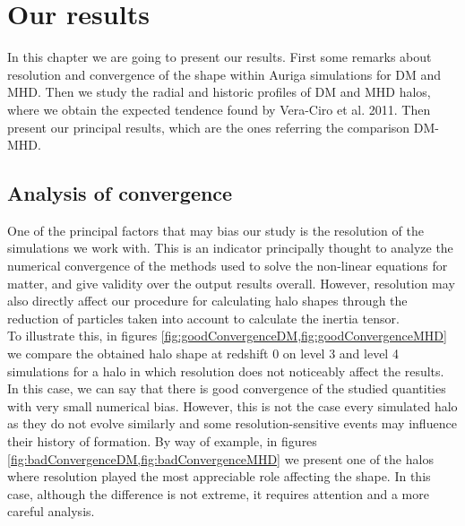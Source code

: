 \chapter{Our results}

In this chapter we are going to present our results. First some remarks about resolution and convergence of the shape within Auriga simulations for DM and MHD. Then we study the radial and historic profiles of DM and MHD halos, where we obtain the expected tendence found by Vera-Ciro et al. 2011. Then present our principal results, which are the ones referring the comparison DM-MHD.

\section{Analysis of convergence}
One of the principal factors that may bias our study is the resolution of the simulations we work with. This is an indicator principally thought to analyze the numerical convergence of the methods used to solve the non-linear equations for matter, and give validity over the output results overall. However, resolution may also directly affect our procedure for calculating halo shapes through the reduction of particles taken into account to calculate the inertia tensor.\\

To illustrate this, in figures \ref{fig:goodConvergenceDM,fig:goodConvergenceMHD} we compare the obtained halo shape at redshift 0 on level 3 and level 4 simulations for a halo in which resolution does not noticeably affect the results. In this case, we can say that there is good convergence of the studied quantities with very small numerical bias. However, this is not the case every simulated halo as they do not evolve similarly and some resolution-sensitive events may influence their history of formation. By way of example, in figures \ref{fig:badConvergenceDM,fig:badConvergenceMHD} we present one of the halos where resolution played the most appreciable role affecting the shape. In this case, although the difference is not extreme, it requires attention and a more careful analysis.\\

